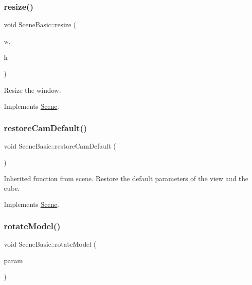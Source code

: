 \subsubsection{\texorpdfstring{resize()}{resize()}}
{\footnotesize\ttfamily void Scene\+Basic\+::resize (\begin{DoxyParamCaption}\item[{int}]{w,  }\item[{int}]{h }\end{DoxyParamCaption})\hspace{0.3cm}{\ttfamily [virtual]}}



Resize the window. 



Implements \hyperlink{class_scene_a454bd0a09c125201fbb32e15d4f62fa3}{Scene}.

\hypertarget{class_scene_basic_ad7930ecd7654ac2c794ba666d71330e0}{}\label{class_scene_basic_ad7930ecd7654ac2c794ba666d71330e0} 
\subsubsection{\texorpdfstring{restore\+Cam\+Default()}{restoreCamDefault()}}
{\footnotesize\ttfamily void Scene\+Basic\+::restore\+Cam\+Default (\begin{DoxyParamCaption}{ }\end{DoxyParamCaption})\hspace{0.3cm}{\ttfamily [virtual]}}



Inherited function from scene. Restore the default parameters of the view and the cube. 



Implements \hyperlink{class_scene_a74dc104a3f44abf1f09d7b627c9baa36}{Scene}.

\hypertarget{class_scene_basic_aa434179e3d31306f521f0d38c34baea3}{}\label{class_scene_basic_aa434179e3d31306f521f0d38c34baea3} 
\subsubsection{\texorpdfstring{rotate\+Model()}{rotateModel()}}
{\footnotesize\ttfamily void Scene\+Basic\+::rotate\+Model (\begin{DoxyParamCaption}\item[{\hyperlink{structset_of_values}{set\+Of\+Values}}]{param }\end{DoxyParamCaption})\hspace{0.3cm}{\ttfamily [virtual]}}



